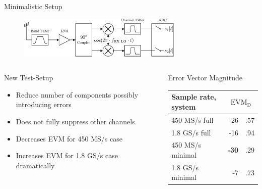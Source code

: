 \documentclass[10pt]{beamer}
\newcommand{\mc}[2]{\multicolumn{#1}{c|}{#2}}
\begin{document}
\begin{frame}{Minimalistic Setup}
  \begin{figure}
    \centering
    \includegraphics[width=0.7\textwidth]{figures/rx_2_bd}
  \end{figure}

  \begin{columns}[T]
    \begin{column}{.5\textwidth}
      \begin{block}{New Test-Setup}
        \begin{itemize}
        \item Reduce number of components possibly introducing errors
        \item Does not fully suppress other channels
        \item Decreases EVM for 450 MS/s case
        \item Increases EVM for 1.8 GS/s case dramatically
        \end{itemize}
      \end{block}
    \end{column}
    \begin{column}{.5\textwidth}
      \begin{block}{Error Vector Magnitude}
        \begin{tabular}{|l|r@{}l|}
          \hline
          Sample rate, system             & \mc{2}{$\text{EVM}_\text{D}$} \\ \hline
          450 MS/s full                   & -26&.57      \\ \hline
          1.8 GS/s full                   & -16&.94      \\ \hline
          450 MS/s minimal                & {\bf-30}&.29 \\ \hline
          1.8 GS/s minimal                & -7&.73       \\ \hline
        \end{tabular}
      \end{block}
    \end{column}
  \end{columns}
\end{frame}
\end{document}
